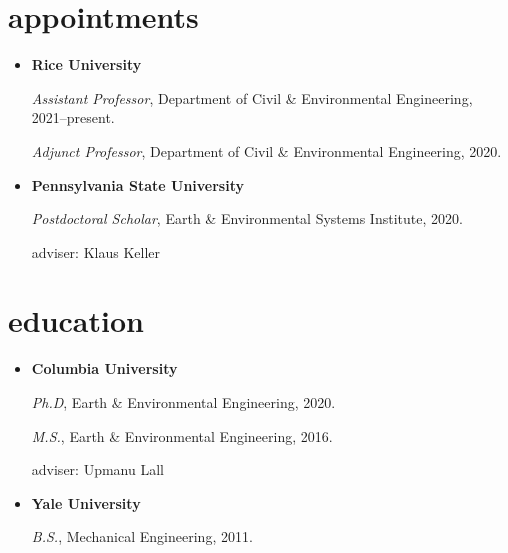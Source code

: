 \documentclass[10pt,oneside]{article}
\begin{document}

\section{\color{BrickRed}appointments}

\mbox{}\vspace{-\dimexpr\baselineskip\relax}

\begin{itemize}[label={}]
  
  \item \textbf{Rice University}
        
        \textit{Assistant Professor}, Department of Civil \& Environmental Engineering, 2021--present.
        
        
        \textit{Adjunct Professor}, Department of Civil \& Environmental Engineering, 2020.
        
        
        
  \item \textbf{Pennsylvania State University}
        
        \textit{Postdoctoral Scholar}, Earth \& Environmental Systems Institute, 2020.
        
        adviser: Klaus Keller
        
        
        
\end{itemize}


\section{\color{BrickRed}education}

\mbox{}\vspace{-\dimexpr\baselineskip\relax}

\begin{itemize}[label={}]
  
  \item \textbf{Columbia University}
        
        \textit{Ph.D}, Earth \& Environmental Engineering, 2020.
        
        \textit{M.S.}, Earth \& Environmental Engineering, 2016.
        
        
        adviser: Upmanu Lall
        
        
  \item \textbf{Yale University}
        
        \textit{B.S.}, Mechanical Engineering, 2011.
        
        
        
\end{itemize}
\end{document}
